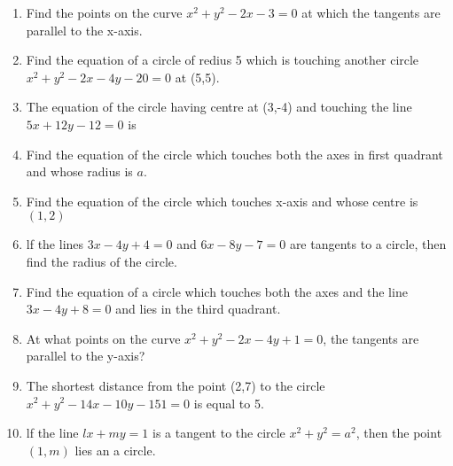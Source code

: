 \begin{enumerate}[label=\thesection.\arabic*,ref=\thesection.\theenumi]

\item Find the points on the curve $x^2+y^2-2x-3=0$ at which the tangents are parallel to the x-axis.
\label{chapters/12/6/3/19}
\\
\solution

\item Find the equation of a circle of redius 5 which is touching another circle $x^2+y^2-2x-4y-20=0$ at (5,5).
\item The equation of the circle having centre at (3,-4) and touching the line $5x+12y-12=0$ is \makebox[1cm]{\hrulefill}                     
 \item Find the equation of the circle which touches both the axes in first quadrant and whose radius is $a$.
 \item Find the equation of the circle which touches x-axis and whose centre is $(1,2)$
 \item lf the lines $3x-4y+4=0$ and $6x-8y-7=0$ are tangents to a circle, then find the radius of the circle.
 \item Find the equation of a circle which touches  both the axes and the line $3x-4y+8=0$ and lies in the third quadrant.
\item At what points on the curve $x^2+y^2-2x-4y+1=0$, the tangents are parallel to the y-axis?
\item The shortest distance from the point (2,7) to the circle $x^2+y^2- 14x-10y-151=0$ is equal to 5.
\item lf the line $lx+my=1$ is a tangent to the circle $x^2+y^2=a^2$, then the point $(1,m)$ lies an a circle.

\end{enumerate}
